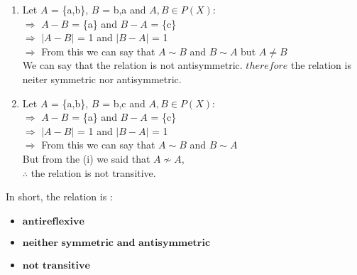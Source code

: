 \documentclass{article}
\begin{document}
\begin{enumerate}
\begin{enumerate}
\begin{enumerate}
        \item Let $A$ = \{a,b\}, $B$ = {b,a} and $A,B \in P(X)$:\\
             $\Rightarrow$ $A-B$ = \{a\} and $B-A$ = \{c\} \\
             $\Rightarrow$ $\left\lvert A - B\right\rvert$ = 1 and $\left\lvert B - A\right\rvert$ = 1\\
             $\Rightarrow$ From this we can say that $A \sim B$ and $B \sim A$ but $A \neq B$\\
             We can say that the relation is not antisymmetric. $therefore$ the relation is 
             neiter symmetric nor antisymmetric.\\

        \item Let $A$ = \{a,b\}, $B$ = {b,c} and $A,B \in P(X)$:\\
             $\Rightarrow$ $A-B$ = \{a\} and $B-A$ = \{c\} \\
             $\Rightarrow$ $\left\lvert A - B\right\rvert$ = 1 and $\left\lvert B - A\right\rvert$ = 1\\
             $\Rightarrow$ From this we can say that $A \sim B$ and $B \sim A$\\
             But from the (i) we said that $A \nsim A$,\\ $\therefore$ the relation is not transitive.
            \end{enumerate}

In short, the relation is :
\begin{itemize}
    \item $\textbf{antireflexive}$
    \item $\textbf{neither symmetric and antisymmetric}$
    \item $\textbf{not transitive}$
\end{itemize}

\pagebreak %


\end{enumerate}
\end{enumerate}
\end{document}
